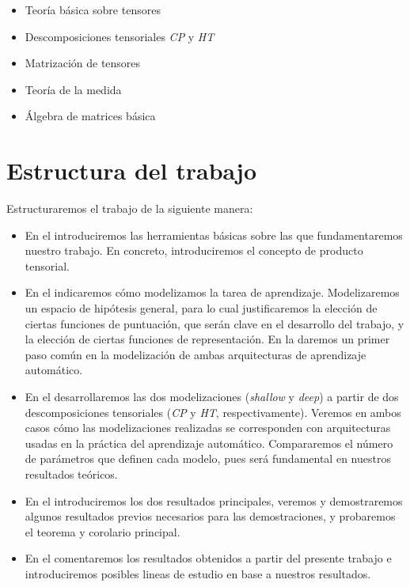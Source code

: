 \begin{itemize}
	\item Teoría básica sobre tensores
	\item Descomposiciones tensoriales \textit{CP} y \textit{HT}
	\item Matrización de tensores
	\item Teoría de la medida
	\item Álgebra de matrices básica
\end{itemize}

\section{Estructura del trabajo}

Estructuraremos el trabajo de la siguiente manera:

\begin{itemize}
	\item En el  introduciremos las herramientas básicas sobre las que fundamentaremos nuestro trabajo. En concreto, introduciremos el concepto de producto tensorial.
	\item En el  indicaremos cómo modelizamos la tarea de aprendizaje. Modelizaremos un espacio de hipótesis general, para lo cual justificaremos la elección de ciertas funciones de puntuación, que serán clave en el desarrollo del trabajo, y la elección de ciertas funciones de representación. En la  daremos un primer paso común en la modelización de ambas arquitecturas de aprendizaje automático.
	\item En el  desarrollaremos las dos modelizaciones (\textit{shallow} y \textit{deep}) a partir de dos descomposiciones tensoriales (\textit{CP} y \textit{HT}, respectivamente). Veremos en ambos casos cómo las modelizaciones realizadas se corresponden con arquitecturas usadas en la práctica del aprendizaje automático. Compararemos el número de parámetros que definen cada modelo, pues será fundamental en nuestros resultados teóricos.
	\item En el  introduciremos los dos resultados principales, veremos y demostraremos algunos resultados previos necesarios para las demostraciones, y probaremos el teorema y corolario principal.
	\item En el  comentaremos los resultados obtenidos a partir del presente trabajo e introduciremos posibles lineas de estudio en base a nuestros resultados.
\end{itemize}
